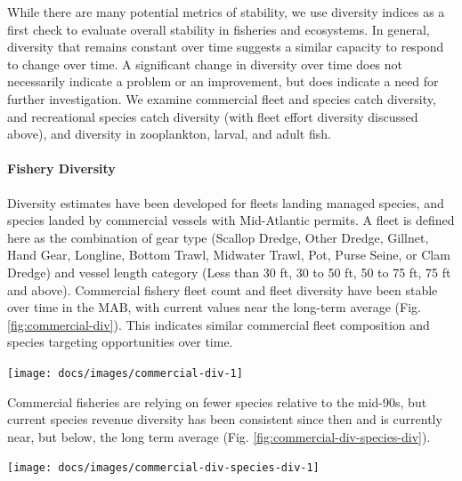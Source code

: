\documentclass[
  10pt,
]{article}
\let\origfigure\figure
\let\endorigfigure\endfigure
\renewenvironment{figure}[1][2] {
    \expandafter\origfigure\expandafter[H]
} {
    \endorigfigure
}
\begin{document}
While there are many potential metrics of stability, we use diversity
indices as a first check to evaluate overall stability in fisheries and
ecosystems. In general, diversity that remains constant over time
suggests a similar capacity to respond to change over time. A
significant change in diversity over time does not necessarily indicate
a problem or an improvement, but does indicate a need for further
investigation. We examine commercial fleet and species catch diversity,
and recreational species catch diversity (with fleet effort diversity
discussed above), and diversity in zooplankton, larval, and adult fish.

\hypertarget{fishery-diversity}{%
\paragraph{Fishery Diversity}\label{fishery-diversity}}

Diversity estimates have been developed for fleets landing managed
species, and species landed by commercial vessels with Mid-Atlantic
permits. A fleet is defined here as the combination of gear type
(Scallop Dredge, Other Dredge, Gillnet, Hand Gear, Longline, Bottom
Trawl, Midwater Trawl, Pot, Purse Seine, or Clam Dredge) and vessel
length category (Less than 30 ft, 30 to 50 ft, 50 to 75 ft, 75 ft and
above). Commercial fishery fleet count and fleet diversity have been
stable over time in the MAB, with current values near the long-term
average (Fig. \ref{fig:commercial-div}). This indicates similar
commercial fleet composition and species targeting opportunities over
time.

\begin{figure}

{\centering \texttt{[image: docs/images/commercial-div-1]} 

}

\caption{Fleet diversity and fleet count in the Mid-Atlantic.}\label{fig:commercial-div}
\end{figure}

Commercial fisheries are relying on fewer species relative to the
mid-90s, but current species revenue diversity has been consistent since
then and is currently near, but below, the long term average (Fig.
\ref{fig:commercial-div-species-div}).

\begin{figure}

{\centering \texttt{[image: docs/images/commercial-div-species-div-1]} 

}

\caption{Species revenue diversity in the Mid-Atlantic.}\label{fig:commercial-div-species-div}
\end{figure}
\end{document}
